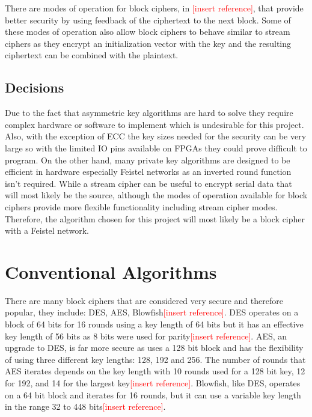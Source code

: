 \documentclass[12pt,twoside,a4paper]{report}
\begin{document}
    There are modes of operation for block ciphers, in \textcolor{red}{[insert reference]}, that provide better security by using feedback of the ciphertext to the next block. Some of these modes of operation also allow block ciphers to behave similar to stream ciphers as they encrypt an initialization vector with the key and the resulting ciphertext can be combined with the plaintext.
    
    \subsection{Decisions}
    Due to the fact that asymmetric key algorithms are hard to solve they require complex hardware or software to implement which is undesirable for this project. Also, with the exception of ECC the key sizes needed for the security can be very large so with the limited IO pins available on FPGAs they could prove difficult to program. On the other hand, many private key algorithms are designed to be efficient in hardware especially Feistel networks as an inverted round function isn't required. While a stream cipher can be useful to encrypt serial data that will most likely be the source, although the modes of operation available for block ciphers provide more flexible functionality including stream cipher modes. Therefore, the algorithm chosen for this project will most likely be a block cipher with a Feistel network.
    
    \section{Conventional Algorithms}
    There are many block ciphers that are considered very secure and therefore popular, they include: DES, AES, Blowfish\textcolor{red}{[insert reference]}.
    DES operates on a block of 64 bits for 16 rounds using a key length of 64 bits but it has an effective key length of 56 bits as 8 bits were used for parity\textcolor{red}{[insert reference]}.
    AES, an upgrade to DES, is far more secure as uses a 128 bit block and has the flexibility of using three different key lengths: 128, 192 and 256. The number of rounds that AES iterates depends on the key length with 10 rounds used for a 128 bit key, 12 for 192, and 14 for the largest key\textcolor{red}{[insert reference]}.
    Blowfish, like DES, operates on a 64 bit block and iterates for 16 rounds, but it can use a variable key length in the range 32 to 448 bits\textcolor{red}{[insert reference]}.
    
\end{document}
